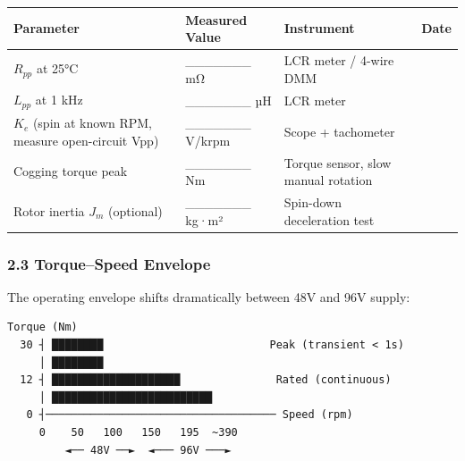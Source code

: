\documentclass[
]{article}
\newcounter{none} %
\begin{document}
{\def\LTcaptype{none} %
\begin{longtable}[]{@{}
  >{\raggedright\arraybackslash}p{}
  >{\raggedright\arraybackslash}p{}
  >{\raggedright\arraybackslash}p{}
  >{\raggedright\arraybackslash}p{}@{}}
\toprule\noalign{}
\begin{minipage}[b]{\linewidth}\raggedright
Parameter
\end{minipage} & \begin{minipage}[b]{\linewidth}\raggedright
Measured Value
\end{minipage} & \begin{minipage}[b]{\linewidth}\raggedright
Instrument
\end{minipage} & \begin{minipage}[b]{\linewidth}\raggedright
Date
\end{minipage} \\
\midrule\noalign{}
\endhead
\bottomrule\noalign{}
\endlastfoot
\(R_{pp}\) at 25°C & \_\_\_\_\_\_\_ mΩ & LCR meter / 4-wire DMM & \\
\(L_{pp}\) at 1 kHz & \_\_\_\_\_\_\_ µH & LCR meter & \\
\(K_e\) (spin at known RPM, measure open-circuit Vpp) & \_\_\_\_\_\_\_
V/krpm & Scope + tachometer & \\
Cogging torque peak & \_\_\_\_\_\_\_ Nm & Torque sensor, slow manual
rotation & \\
Rotor inertia \(J_m\) (optional) & \_\_\_\_\_\_\_ kg·m² & Spin-down
deceleration test & \\
\end{longtable}
}

\subsubsection{2.3 Torque--Speed Envelope}\label{torquespeed-envelope}

The operating envelope shifts dramatically between 48V and 96V supply:

\begin{verbatim}
Torque (Nm)
  30 ┤ ████████                          Peak (transient < 1s)
     │ ████████
  12 ┤ ████████████████████               Rated (continuous)
     │ █████████████████████████
   0 ┤──────────────────────────────────── Speed (rpm)
     0    50   100   150   195  ~390
         ◄── 48V ──►  ◄─── 96V ───►
\end{verbatim}
\end{document}
